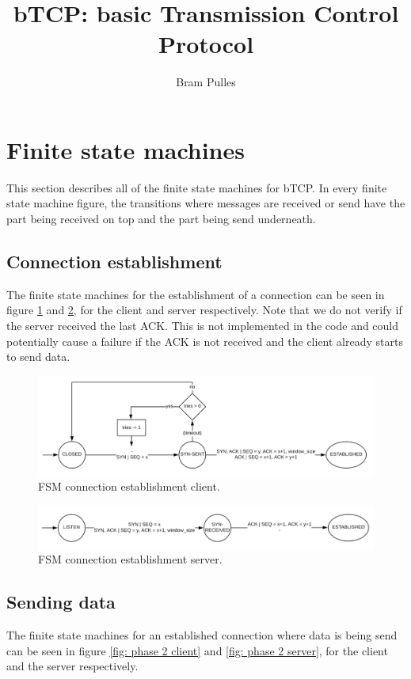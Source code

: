 \documentclass[a4paper]{article}
\author{Bram Pulles}
\title{\textbf{bTCP: basic Transmission Control Protocol}}
\begin{document}
\maketitle

\tableofcontents
\pagebreak

\section{Finite state machines}
This section describes all of the finite state machines for bTCP. In every finite state machine figure, the transitions where messages are received or send have the part being received on top and the part being send underneath.

	\subsection{Connection establishment}
	The finite state machines for the establishment of a connection can be seen in figure \ref{fig: phase 1 client} and \ref{fig: phase 1 server}, for the client and server respectively. Note that we do not verify if the server received the last ACK. This is not implemented in the code and could potentially cause a failure if the ACK is not received and the client already starts to send data.
	\begin{figure}[h]
		\centering
		\includegraphics[width = \textwidth]{phase1_client.png}
		\caption{FSM connection establishment client.}
		\label{fig: phase 1 client}
	\end{figure}
	\begin{figure}[h]
		\centering
		\includegraphics[width = \textwidth]{phase1_server.png}
		\caption{FSM connection establishment server.}
		\label{fig: phase 1 server}
	\end{figure}

	\subsection{Sending data}
	The finite state machines for an established connection where data is being send can be seen in figure \ref{fig: phase 2 client} and \ref{fig: phase 2 server}, for the client and the server respectively.
\end{document}
